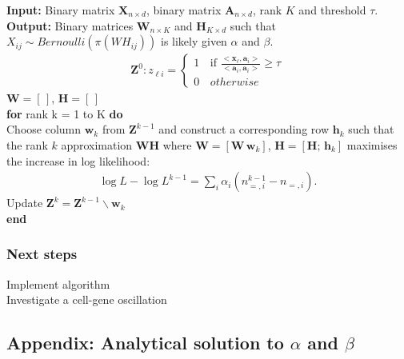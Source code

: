 \documentclass[12pt]{article}
\begin{document}
{\bf Input:} Binary matrix $\mathbf{X}_{n \times d}$, binary matrix $\mathbf{A}_{n \times d}$,  rank $K$ and threshold $\tau$. \\
{\bf Output:} Binary matrices $\mathbf{W}_{n \times K}$ and $\mathbf{H}_{K \times d}$  such that $X_{ij} \sim Bernoulli (\pi(WH_{ij}))$ is likely given $\alpha$ and $\beta$. \\
\begin{align*}
  \mathbf{Z}^{0}:  z_{\ell i} =
   \begin{cases}
      1 & \text{if }  \frac{<\mathbf{x}_{\ell}, \mathbf{a}_i>}{<\mathbf{a}_{i},\mathbf{a}_{i}>} \geq \tau \\
      0 \, &otherwise
    \end{cases}
\end{align*}
$\mathbf{W} = [\, ]$,  $\mathbf{H} = [\, ]$ \\
{\bf for} rank k = 1 to K {\bf do} \\
\indent Choose column $\mathbf{w}_{k}$ from $\mathbf{Z}^{k-1}$ and construct a corresponding row $\mathbf{h}_{k}$ such that the rank $k$ approximation $\mathbf{WH}$ where  $\mathbf{W} = [\mathbf{W}\, \mathbf{w}_{k}]$,  $\mathbf{H} = [\mathbf{H} ;\, \mathbf{h}_{k}]$ maximises the increase in log likelihood:
  \begin{align*}
   \log L - \log L^{k-1} = \sum_{i} \alpha_i ( n^{k-1}_{=,i} - n_{=,i}).
\end{align*}
\indent Update $\mathbf{Z}^k = \mathbf{Z}^{k-1} \backslash \mathbf{w}_{k}$ \\
{\bf end}

\subsubsection*{Next steps} %

Implement algorithm \\ 
Investigate a cell-gene oscillation



\subsection*{Appendix: Analytical solution to $\alpha$ and $\beta$} %
\end{document}
